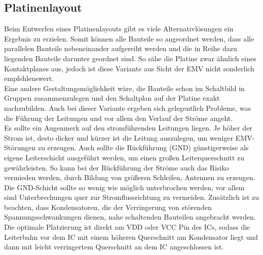 \subsection{Platinenlayout}
Beim Entwerfen eines Platinenlayouts gibt es viele Alternativlösungen ein Ergebnis zu erzielen. Somit können alle Bauteile so angeordnet werden, dass alle parallelen Bauteile nebeneinander aufgereiht werden und die in Reihe dazu liegenden Bauteile darunter geordnet sind. So sähe die Platine zwar ähnlich eines Kontaktplanes aus, jedoch ist diese Variante aus Sicht der EMV nicht sonderlich empfehlenswert.\\
Eine andere Gestaltungsmöglichkeit wäre, die Bauteile schon im Schaltbild in Gruppen zusammenzulegen und den Schaltplan auf der Platine exakt nachzubilden. Auch bei dieser Variante ergeben sich gelegentlich Probleme, was die Führung der Leitungen und vor allem den Verlauf der Ströme angeht.\\
Es sollte ein Augenmerk auf den stromführenden Leitungen liegen. Je höher der Strom ist, desto dicker und kürzer ist die Leitung auszulegen, um weniger EMV-Störungen zu erzeugen. Auch sollte die Rückführung (GND) günstigerweise als eigene Leiterschicht ausgeführt werden, um einen großen Leiterquerschnitt zu gewährleisten. So kann bei der Rückführung der Ströme auch das Risiko vermieden werden, durch Bildung von größeren Schleifen, Antennen zu erzeugen. Die GND-Schicht sollte so wenig wie möglich unterbrochen werden, vor allem sind Unterbrechungen quer zur Stromflussrichtung zu vermeiden. Zusätzlich ist zu beachten, dass Kondensatoren, die der Verringerung von störenden Spannungsschwankungen dienen, nahe schaltenden Bauteilen angebracht werden. Die optimale Platzierung ist direkt am VDD oder VCC Pin des ICs, sodass die Leiterbahn vor dem IC mit einem höheren Querschnitt am Kondensator liegt und dann mit leicht verringertem Querschnitt an dem IC angeschlossen ist.



